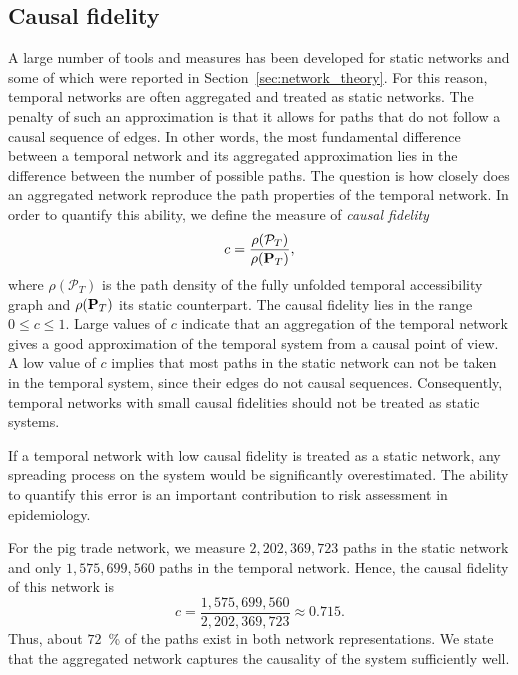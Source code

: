 \subsection{Causal fidelity}\label{sec:causal_fidelity}
A large number of tools and measures has been developed for static networks and some of which were reported in Section~\ref{sec:network_theory}.
For this reason, temporal networks are often aggregated and treated as static networks.
The penalty of such an approximation is that it allows for paths that do not follow a causal sequence of edges.
In other words, the most fundamental difference between a temporal network and its aggregated approximation lies in the difference between the number of possible paths.
The question is how closely does an aggregated network reproduce the path properties of the temporal network.
In order to quantify this ability, we define the measure of \emph{causal fidelity}
\begin{equation}\label{eq:causal_fidelity}
c=\frac{\rho (\mathcal{P}_T)}{\rho (\mathbf{P}_T)} ,
\end{equation}
where $\rho (\mathcal{P}_T)$ is the path density of the fully unfolded temporal accessibility graph and $\rho (\mathbf{P}_T)$ its static counterpart.
The causal fidelity lies in the range $0\leq c \leq 1$.
Large values of $c$ indicate that an aggregation of the temporal network gives a good approximation of the temporal system from a causal point of view.
A low value of $c$ implies that most paths in the static network can not be taken in the temporal system, since their edges do not causal sequences.
Consequently, temporal networks with small causal fidelities should not be treated as static systems.

If a temporal network with low causal fidelity is treated as a static network, any spreading process on the system would be significantly overestimated.
The ability to quantify this error is an important contribution to risk assessment in epidemiology.

For the pig trade network, we measure $2,202,369,723$ paths in the static network and only $1,575,699,560$ paths in the temporal network.
Hence, the causal fidelity of this network is
\begin{equation}\label{eq:pig_causal_fidelity}
c=\frac{1,575,699,560}{2,202,369,723}\approx 0.715.
\end{equation}
Thus, about $72$~\% of the paths exist in both network representations.
We state that the aggregated network captures the causality of the system sufficiently well. 


